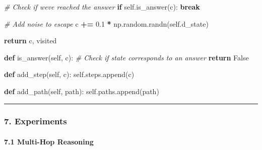 \documentclass[
  11pt,
  a4paper,
]{article}
\newenvironment{Shaded}{\begin{snugshade}}{\end{snugshade}}
\newcommand{\CommentTok}[1]{\textcolor[rgb]{0.56,0.35,0.01}{\textit{#1}}}
\newcommand{\ControlFlowTok}[1]{\textcolor[rgb]{0.13,0.29,0.53}{\textbf{#1}}}
\newcommand{\FloatTok}[1]{\textcolor[rgb]{0.00,0.00,0.81}{#1}}
\newcommand{\KeywordTok}[1]{\textcolor[rgb]{0.13,0.29,0.53}{\textbf{#1}}}
\newcommand{\NormalTok}[1]{#1}
\newcommand{\OperatorTok}[1]{\textcolor[rgb]{0.81,0.36,0.00}{\textbf{#1}}}
\newcommand{\VariableTok}[1]{\textcolor[rgb]{0.00,0.00,0.00}{#1}}
\begin{document}
\begin{Shaded}
\begin{Highlighting}[]
            \CommentTok{\# Check if we\textquotesingle{}ve reached the answer}
            \ControlFlowTok{if} \VariableTok{self}\NormalTok{.is\_answer(c):}
                \ControlFlowTok{break}
            
            \CommentTok{\# Add noise to escape}
\NormalTok{            c }\OperatorTok{+=} \FloatTok{0.1} \OperatorTok{*}\NormalTok{ np.random.randn(}\VariableTok{self}\NormalTok{.d\_state)}
        
        \ControlFlowTok{return}\NormalTok{ c, visited}
    
    \KeywordTok{def}\NormalTok{ is\_answer(}\VariableTok{self}\NormalTok{, c):}
        \CommentTok{\# Check if state corresponds to an answer}
        \ControlFlowTok{return} \VariableTok{False}
    
    \KeywordTok{def}\NormalTok{ add\_step(}\VariableTok{self}\NormalTok{, c):}
        \VariableTok{self}\NormalTok{.steps.append(c)}
    
    \KeywordTok{def}\NormalTok{ add\_path(}\VariableTok{self}\NormalTok{, path):}
        \VariableTok{self}\NormalTok{.paths.append(path)}
\end{Highlighting}
\end{Shaded}

\begin{center}\rule{0.5\linewidth}{0.5pt}\end{center}

\subsubsection{7. Experiments}\label{experiments}

\paragraph{7.1 Multi-Hop Reasoning}\label{multi-hop-reasoning-2}
\end{document}
